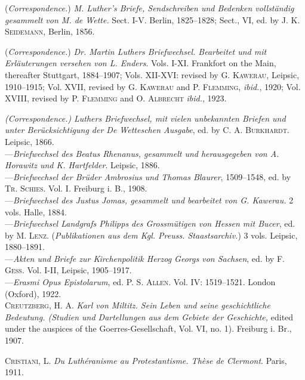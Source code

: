 (\textit{Correspondence.}) \textit{M. Luther’s Briefe, Sendschreiben und Bedenken vollständig
gesammelt von M. de Wette.} Sect. I-V. Berlin, 1825--1828; Sect.,
VI, ed. by \textsc{J. K. Seidemann}, Berlin, 1856.

(\textit{Correspondence.}) \textit{Dr. Martin Luthers Briefwechsel. Bearbeitet und mit Erläuterungen
versehen von L. Enders}. Vols. I-XI. Frankfort on the Main,
thereafter Stuttgart, 1884--1907; Vols. XII-XVI: revised by \textsc{G. Kawerau,}
Leipsic, 1910--1915; Vol. XVII, revised by \textsc{G. Kawerau} and \textsc{P. Flemming}, \textit{ibid.}, 1920; Vol. XVIII, revised by \textsc{P. Flemming} and \textsc{O. Albrecht}
\textit{ibid.}, 1923.

\textit{(Correspondence.)} \textit{Luthers Briefwechsel, mit vielen unbekannten Briefen und
unter Berücksichtigung der De Wetteschen Ausgabe}, ed. by \textsc{C. A. Burkhardt}.
Leipsic, 1866. \\
---\textit{Briefwechsel des Beatus Rhenanus, gesammelt und herausgegeben von A.
Horawitz und K. Hartfelder}. Leipsic, 1886. \\
---\textit{Briefwechsel der Brüder Ambrosius und Thomas Blaurer}, 1509--1548, ed.
by \textsc{Tr. Schies.} Vol. I. Freiburg i. B., 1908. \\
---\textit{Briefwechsel des Justus Jomas, gesammelt und bearbeitet von G. Kawerau.}
2 vols. Halle, 1884. \\
---\textit{Briefwechsel Landgrafs Philipps des Grossmütigen von Hessen mit
Bucer}, ed. by \textsc{M. Lenz.} (\textit{Publikationen aus dem Kgl. Preuss. Staastsarchiv.})
3 vols. Leipsic, 1880--1891. \\
---\textit{Akten und Briefe zur Kirchenpolitik Herzog Georgs von Sachsen}, ed.
by \textsc{F. Gess.} Vol. I-II, Leipsic, 1905--1917. \\
---\textit{Erasmi Opus Epistolarum}, ed. \textsc{P. S. Allen.} Vol. IV: 1519--1521. London
(Oxford), 1922. \\

\textsc{Creutzberg}, H. A. \textit{Karl von Miltitz. Sein Leben und seine geschichtliche
Bedeutung. (Studien und Dartellungen aus dem Gebiete der Geschichte,}
edited under the auspices of the Goerres-Gesellschaft, Vol. VI, no. 1).
Freiburg i. Br., 1907.

\textsc{Cristiani, L.} \textit{Du Luthéranisme au Protestantisme. Thèse de Clermont}. Paris,
1911.

